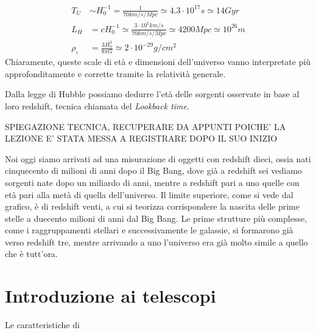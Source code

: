 \documentclass[a4paper,twoside,openany,notitlepage]{book}
\newcommand{\e}[1]{\cdot 10^{#1}}
\theoremstyle{definition}
\theoremstyle{plain}
\begin{document}
\begin{align}
	T_U   & \sim H_0^{-1} = \frac{1}{70km/s/Mpc} \simeq 4.3\e{17}s \simeq 14Gyr \\
	L_H   & = cH_0^{-1} \simeq \frac{3\e{5}km/s}{70km/s/Mpc} \simeq 4200Mpc \simeq 10^{26}m \\
	\rho_\varepsilon   & = \frac{3H_0^3}{8\pi G} \simeq 2\e{-29}g/cm^2
\end{align}
Chiaramente, queste scale di età e dimensioni dell'universo vanno interpretate più approfonditamente e corrette tramite la relatività generale.

Dalla legge di Hubble possiamo dedurre l'età delle sorgenti osservate in base al loro redshift, tecnica chiamata del \textit{Lookback time}.

SPIEGAZIONE TECNICA, RECUPERARE DA APPUNTI POICHE' LA LEZIONE E' STATA MESSA A REGISTRARE DOPO IL SUO INIZIO

Noi oggi siamo arrivati ad una misurazione di oggetti con redshift dieci, ossia nati cinquecento di milioni di anni dopo il Big Bang, dove già a redshift sei vediamo sorgenti nate dopo un miliardo di anni, mentre a redshift pari a uno quelle con età pari alla metà di quella dell'universo. Il limite superiore, come si vede dal grafico, è di redshift venti, a cui si teorizza corrispondere la nascita delle prime stelle a duecento milioni di anni dal Big Bang. Le prime strutture più complesse, come i raggruppamenti stellari e successivamente le galassie, si formarono già verso redshift tre, mentre arrivando a uno l'universo era già molto simile a quello che è tutt'ora.

\chapter{Introduzione ai telescopi}

Le caratteristiche di
\end{document}
